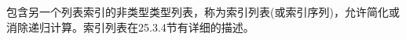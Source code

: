 包含另一个列表索引的非类型类型列表，称为索引列表(或索引序列)，允许简化或消除递归计算。索引列表在25.3.4节有详细的描述。










































